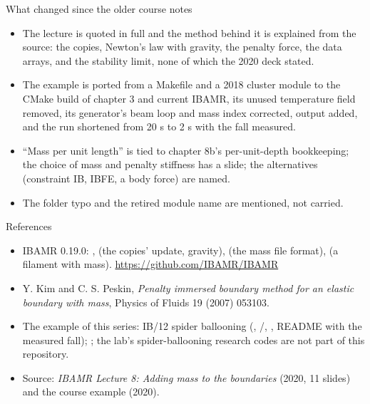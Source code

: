 \documentclass[aspectratio=169,11pt]{beamer}
\begin{document}
\begin{frame}{What changed since the older course notes}
\label{fr:changed}
\footnotesize
\begin{itemize}
  \item The lecture is quoted in full and the method behind it is explained from the source: the copies, Newton's law with gravity, the penalty force, the data arrays, and the stability limit, none of which the 2020 deck stated.
  \item The example is ported from a Makefile and a 2018 cluster module to the CMake build of chapter 3 and current IBAMR, its unused temperature field removed, its generator's beam loop and mass index corrected, output added, and the run shortened from 20 s to 2 s with the fall measured.
  \item ``Mass per unit length'' is tied to chapter 8b's per-unit-depth bookkeeping; the choice of mass and penalty stiffness has a slide; the alternatives (constraint IB, IBFE, a body force) are named.
  \item The folder typo and the retired module name are mentioned, not carried.
\end{itemize}
\end{frame}

\begin{frame}{References}
\label{fr:refs}
\scriptsize
\begin{itemize}
  \item IBAMR 0.19.0: ,  (the copies' update, gravity),  (the mass file format),  (a filament with mass). \url{https://github.com/IBAMR/IBAMR}
  \item Y. Kim and C. S. Peskin, \emph{Penalty immersed boundary method for an elastic boundary with mass}, Physics of Fluids 19 (2007) 053103.
  \item The example of this series: IB/12 spider ballooning (, /, , README with the measured fall); ; the lab's spider-ballooning research codes are not part of this repository.
  \item Source: \emph{IBAMR Lecture 8: Adding mass to the boundaries} (2020, 11 slides) and the course example  (2020).
\end{itemize}
\end{frame}
\end{document}
